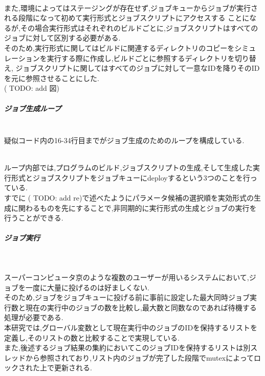 ~\\
また,環境によってはステージングが存在せず,ジョブキューからジョブが実行される段階になって初めて実行形式とジョブスクリプトにアクセスする
ことになるが,その場合実行形式はそれぞれのビルドごとに,ジョブスクリプトはすべてのジョブに対して区別する必要がある.\\
そのため,実行形式に関してはビルドに関連するディレクトリのコピーをシミュレーションを実行する際に作成し,ビルドごとに参照するディレクトリを切り替え,
ジョブスクリプトに関してはすべてのジョブに対して一意なIDを降りそのIDを元に参照させることにした.\\
( TODO: add 図)
\subparagraph{ジョブ生成ループ}~\\
疑似コード内の16-34行目までがジョブ生成のためのループを構成している.\\
{\footnotesize

}~\\
ループ内部では,プログラムのビルド,ジョブスクリプトの生成,そして生成した実行形式とジョブスクリプトをジョブキューにdeployするという3つのことを行っている.\\
すでに ( TODO: add re)で述べたようにパラメータ候補の選択順を実効形式の生成に関わるものを先にすることで,非同期的に実行形式の生成とジョブの実行を行うことができる.\\
\subparagraph{ジョブ実行}~\\
{\footnotesize

}
スーパーコンピュータ京のような複数のユーザーが用いるシステムにおいて,ジョブを一度に大量に投げるのは好ましくない.\\
そのため,ジョブをジョブキューに投げる前に事前に設定した最大同時ジョブ実行数と現在の実行中のジョブの数を比較し,最大数と同数なのであれば待機する処理が必要である.\\
本研究では,グローバル変数として現在実行中のジョブのIDを保持するリストを定義し,そのリストの数と比較することで実現している.\\
また,後述するジョブ結果の集約においてこのジョブIDを保持するリストは別スレッドから参照されており,リスト内のジョブが完了した段階でmutexによってロックされた上で更新される.\\

